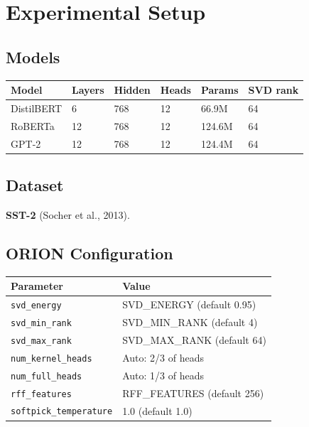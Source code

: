 
\section{Experimental Setup}

\subsection{Models}

\begin{table}[H]
\centering
\small
\begin{tabular}{llllll}
\toprule
\textbf{Model} & \textbf{Layers} & \textbf{Hidden} & \textbf{Heads} & \textbf{Params} & \textbf{SVD rank} \\
\midrule
DistilBERT & 6 & 768 & 12 & 66.9M & 64 \\
RoBERTa & 12 & 768 & 12 & 124.6M & 64 \\
GPT-2 & 12 & 768 & 12 & 124.4M & 64 \\
\bottomrule
\end{tabular}
\end{table}

\subsection{Dataset}

\textbf{SST-2} (Socher et al., 2013).

\subsection{ORION Configuration}

\begin{table}[H]
\centering
\small
\begin{tabular}{ll}
\toprule
\textbf{Parameter} & \textbf{Value} \\
\midrule
\texttt{svd\_energy} & {{SVD\_ENERGY}} (default 0.95) \\
\texttt{svd\_min\_rank} & {{SVD\_MIN\_RANK}} (default 4) \\
\texttt{svd\_max\_rank} & {{SVD\_MAX\_RANK}} (default 64) \\
\texttt{num\_kernel\_heads} & Auto: 2/3 of heads \\
\texttt{num\_full\_heads} & Auto: 1/3 of heads \\
\texttt{rff\_features} & {{RFF\_FEATURES}} (default 256) \\
\texttt{softpick\_temperature} & 1.0 (default 1.0) \\
\bottomrule
\end{tabular}
\end{table}

